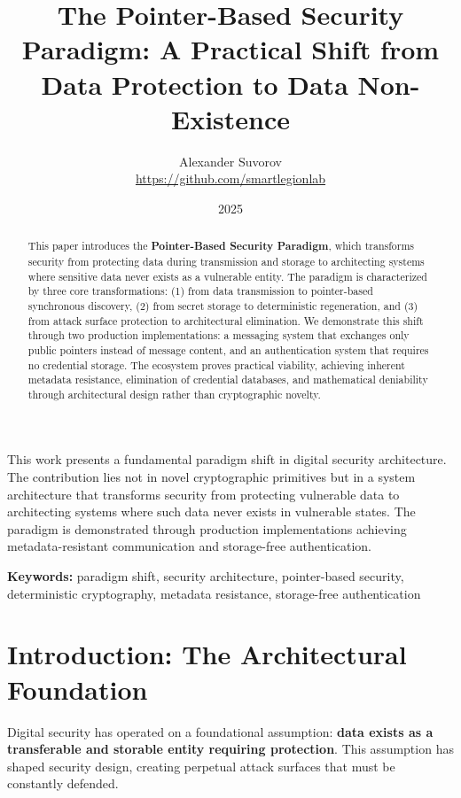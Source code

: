\documentclass[11pt,a4paper]{article}
\title{The Pointer-Based Security Paradigm: A Practical Shift from Data Protection to Data Non-Existence}
\author{Alexander Suvorov \\ \url{https://github.com/smartlegionlab}}
\date{2025}
\begin{document}
\maketitle

\begin{importantbox}
This work presents a fundamental paradigm shift in digital security architecture. The contribution lies not in novel cryptographic primitives but in a system architecture that transforms security from protecting vulnerable data to architecting systems where such data never exists in vulnerable states. The paradigm is demonstrated through production implementations achieving metadata-resistant communication and storage-free authentication.
\end{importantbox}

\begin{abstract}
This paper introduces the \textbf{Pointer-Based Security Paradigm}, which transforms security from protecting data during transmission and storage to architecting systems where sensitive data never exists as a vulnerable entity. The paradigm is characterized by three core transformations: (1) from data transmission to pointer-based synchronous discovery, (2) from secret storage to deterministic regeneration, and (3) from attack surface protection to architectural elimination. We demonstrate this shift through two production implementations: a messaging system that exchanges only public pointers instead of message content, and an authentication system that requires no credential storage. The ecosystem proves practical viability, achieving inherent metadata resistance, elimination of credential databases, and mathematical deniability through architectural design rather than cryptographic novelty.
\end{abstract}

\textbf{Keywords:} paradigm shift, security architecture, pointer-based security, deterministic cryptography, metadata resistance, storage-free authentication

\section{Introduction: The Architectural Foundation}

Digital security has operated on a foundational assumption: \textbf{data exists as a transferable and storable entity requiring protection}. This assumption has shaped security design, creating perpetual attack surfaces that must be constantly defended.
\end{document}
